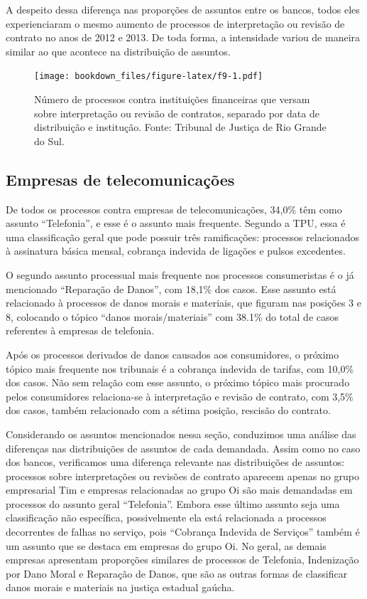 \documentclass[]{report}
\begin{document}
A despeito dessa diferença nas proporções de assuntos entre os bancos,
todos eles experienciaram o mesmo aumento de processos de interpretação
ou revisão de contrato no anos de 2012 e 2013. De toda forma, a
intensidade variou de maneira similar ao que acontece na distribuição de
assuntos.

\begin{figure}[htbp]
\centering
\texttt{[image: bookdown\_files/figure-latex/f9-1.pdf]}
\caption{\label{fig:f9}Número de processos contra instituições financeiras
que versam sobre interpretação ou revisão de contratos, separado por
data de distribuição e institução. Fonte: Tribunal de Justiça de Rio
Grande do Sul.}
\end{figure}

\subsection{Empresas de
telecomunicações}\label{empresas-de-telecomunicacoes}

De todos os processos contra empresas de telecomunicações, 34,0\% têm
como assunto ``Telefonia'', e esse é o assunto mais frequente. Segundo a
TPU, essa é uma classificação geral que pode possuir três ramificações:
processos relacionados à assinatura básica mensal, cobrança indevida de
ligações e pulsos excedentes.

O segundo assunto processual mais frequente nos processos consumeristas
é o já mencionado ``Reparação de Danos'', com 18,1\% dos casos. Esse
assunto está relacionado à processos de danos morais e materiais, que
figuram nas posições 3 e 8, colocando o tópico ``danos
morais/materiais'' com 38.1\% do total de casos referentes à empresas de
telefonia.

Após os processos derivados de danos causados aos consumidores, o
próximo tópico mais frequente nos tribunais é a cobrança indevida de
tarifas, com 10,0\% dos casos. Não sem relação com esse assunto, o
próximo tópico mais procurado pelos consumidores relaciona-se à
interpretação e revisão de contrato, com 3,5\% dos casos, também
relacionado com a sétima posição, rescisão do contrato.

Considerando os assuntos mencionados nessa seção, conduzimos uma análise
das diferenças nas distribuições de assuntos de cada demandada. Assim
como no caso dos bancos, verificamos uma diferença relevante nas
distribuições de assuntos: processos sobre interpretações ou revisões de
contrato aparecem apenas no grupo empresarial Tim e empresas
relacionadas ao grupo Oi são mais demandadas em processos do assunto
geral ``Telefonia''. Embora esse último assunto seja uma classificação
não específica, possivelmente ela está relacionada a processos
decorrentes de falhas no serviço, pois ``Cobrança Indevida de Serviços''
também é um assunto que se destaca em empresas do grupo Oi. No geral, as
demais empresas apresentam proporções similares de processos de
Telefonia, Indenização por Dano Moral e Reparação de Danos, que são as
outras formas de classificar danos morais e materiais na justiça
estadual gaúcha.
\end{document}
